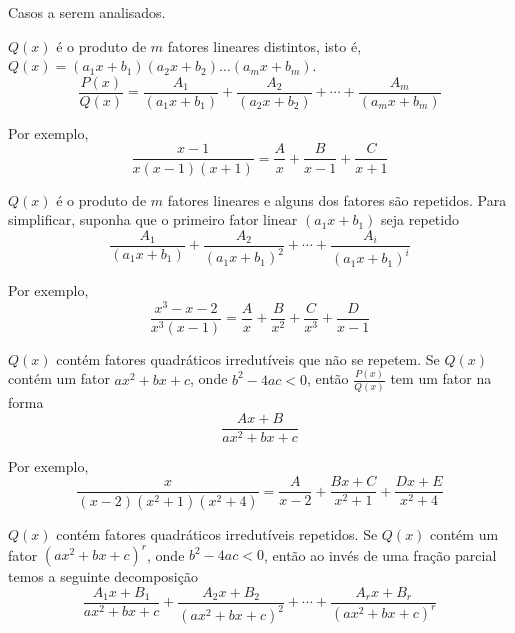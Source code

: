 Casos a serem analisados.

\begin{theory}[Caso 1]
  $Q(x)$ é o produto de $m$ fatores lineares distintos, isto é,
  $Q(x)=(a_1x+b_1)(a_2x+b_2)\dots(a_mx+b_m)$.
  \[
    \frac{P(x)}{Q(x)}
    = \frac{A_1}{(a_1x+b_1)}
    + \frac{A_2}{(a_2x+b_2)}
    + \cdots
    + \frac{A_m}{(a_mx+b_m)}
  \]
\end{theory}

Por exemplo,
\[
  \frac{x-1}{x(x-1)(x+1)}= \frac{A}{x}+ \frac{B}{x-1}+ \frac{C}{x+1}
\]

\begin{theory}[Caso 2]
  $Q(x)$ é o produto de $m$ fatores lineares e alguns dos
  fatores são repetidos. Para simplificar, suponha que o primeiro
  fator linear $(a_1x+b_1)$ seja repetido
  \[
    \frac{A_1}{(a_1x+b_1)}
    + \frac{A_2}{(a_1x+b_1)^2}
    + \cdots
    + \frac{A_i}{(a_1x+b_1)^i}
  \]
\end{theory}

Por exemplo,
\[
  \frac{x^3-x-2}{x^3(x-1)}
  = \frac{A}{x}
  + \frac{B}{x^2}
  + \frac{C}{x^3}
  + \frac{D}{x-1}
\]

\begin{theory}[Caso 3]
  $Q(x)$ contém fatores quadráticos irredutíveis que não se repetem.
  Se $Q(x)$ contém um fator $ax^2+bx+c$, onde $b^2-4ac<0$,
  então $\frac{P(x)}{Q(x)}$ tem um fator na forma
  \[
    \frac{Ax+B}{ax^2+bx+c}
  \]
\end{theory}

Por exemplo,
\[
  \frac{x}{(x-2)(x^2+1)(x^2+4)}
  = \frac{A}{x-2}
  + \frac{Bx+C}{x^2+1}
  + \frac{Dx+E}{x^2+4}
\]

\begin{theory}[Caso 4]
  $Q(x)$ contém fatores quadráticos irredutíveis repetidos.
  Se $Q(x)$ contém um fator $(ax^2+bx+c)^r$, onde $b^2-4ac<0$,
  então ao invés de uma fração parcial temos a seguinte decomposição
  \[
    \frac{A_1x+B_1}{ax^2+bx+c}
    + \frac{A_2x+B_2}{(ax^2+bx+c)^2}
    + \cdots
    + \frac{A_rx+B_r}{(ax^2+bx+c)^r}
  \]
\end{theory}

